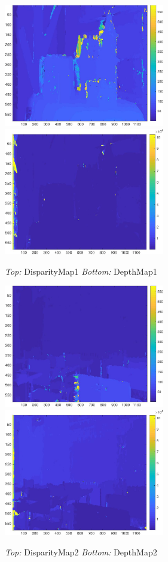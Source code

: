 \begin{figure}[h]
    \centering
    \includegraphics[width=7cm]{DisparityMap1.jpg}
    \includegraphics[width=7cm]{DepthMap1.jpg}
    \caption{\emph{Top:} DisparityMap1 \emph{Bottom:} DepthMap1}
    \label{fig:result1}
\end{figure}

\begin{figure}[h]
    \centering
    \includegraphics[width=7cm]{DisparityMap2.jpg}
    \includegraphics[width=7cm]{DepthMap2.jpg}
    \caption{\emph{Top:} DisparityMap2 \emph{Bottom:} DepthMap2}
    \label{fig:result2}
\end{figure}

